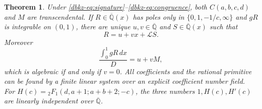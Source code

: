 \documentclass[11pt,a4paper]{article}
\newtheorem{theorem}{Theorem}[section]
\theoremstyle{definition}
\theoremstyle{remark}
\numberwithin{equation}{section}
\begin{document}
\begin{theorem}\label{dbkz-thm:classifier}
Under \eqref{dbkz-eq:signature}--\eqref{dbkz-eq:congruence}, both
$C(a,b,c,d)$ and $M$ are transcendental. If
$R\in\overline{\mathbb Q}(x)$ has poles only in
$\{0,1,-1/c,\infty\}$ and $gR$ is integrable on $(0,1)$, there are
unique $u,v\in\overline{\mathbb Q}$ and
$S\in\overline{\mathbb Q}(x)$ such that
\begin{equation}\label{dbkz-eq:classifier}
 R=u+vx+\mathcal LS.
\end{equation}
Moreover
\[
 \frac{\int_0^1gR\,dx}{D}=u+vM,
\]
which is algebraic if and only if $v=0$. All coefficients and the
rational primitive can be found by a finite linear system over an
explicit coefficient number field.
For $H(c)={}_2F_1(d,a+1;a+b+2;-c)$, the three numbers
$1,H(c),H'(c)$ are linearly independent over
$\overline{\mathbb Q}$.
\end{theorem}
\end{document}
